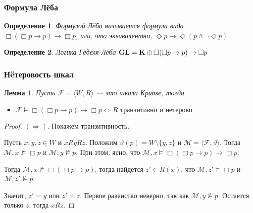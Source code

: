 \documentclass[pdf,utf8,russian,aspectratio=169]{beamer}
\newtheorem{defin}{Определение}
\newtheorem{lem}{Лемма}
\begin{document}
\begin{frame}
  \frametitle{Формула Л\"{е}ба}

\begin{defin}
    Формулой Л\"{е}ба называется формула вида $\Box (\Box p \to p) \to \Box p$, или, что эквивалентно, $\Diamond p \to \Diamond (p \land \neg \Diamond p)$.
\end{defin}

\begin{defin} Логика Г\"{е}деля-Л\"{е}ба
  ${\bf GL} = {\bf K} \oplus \Box (\Box p \to p) \to \Box p$
\end{defin}


\end{frame}

\begin{frame}
  \frametitle{Н\"{e}теровость шкал}
\begin{lem}
  Пусть $\mathcal{F} = \langle W, R \rangle$ --- это шкала Крипке, тогда

\begin{itemize}
  \item $\mathcal{F} \models \Box (\Box p \to p) \to \Box p \Leftrightarrow R \text{ транзитивно и н\"{е}терово}$
\end{itemize}
\end{lem}

\begin{proof}
  $(\Rightarrow)$. Покажем транзитивность.

  Пусть $x, y, z \in W$ и $x R y R z$. Положим $\vartheta(p) = W \setminus \{ y, z \}$ и $\mathcal{M} = \langle \mathcal{F}, \vartheta \rangle$.
  Тогда $\mathcal{M}, x \nvDash \Box p$ и $\mathcal{M}, y \nvDash p$. При этом, ясно, что $\mathcal{M}, x \models \Box (\Box p \to p) \to \Box p$.

  Тогда $\mathcal{M}, x \nvDash \Box (\Box p \to p)$, тогда найдется $z' \in R(x)$, что $\mathcal{M}, z' \models \Box p$ и $\mathcal{M}, z' \nvDash p$.

  Значит, $z' = y$ или $z' = z$. Первое равенство неверно, так как $\mathcal{M}, y \nvDash p$. Остается только $z$, тогда $x R z$.
\end{proof}
\end{frame}
\end{document}
